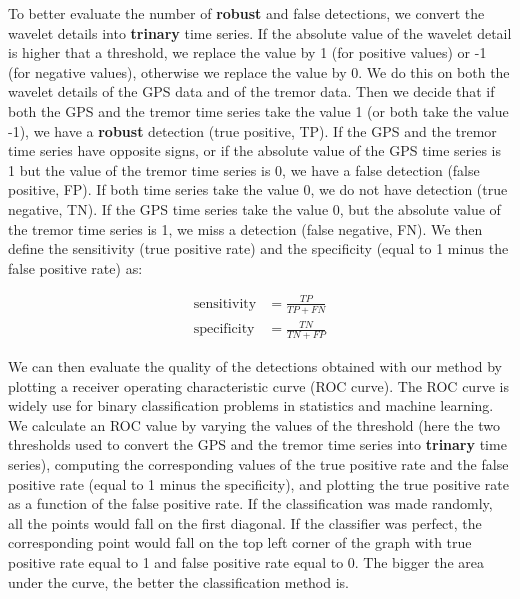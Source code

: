 \documentclass{article}
\begin{document}
To better evaluate the number of \textbf{robust} and false detections, we convert the wavelet details into \textbf{trinary} time series. If the absolute value of the wavelet detail is higher that a threshold, we replace the value by 1 (for positive values) or -1 (for negative values), otherwise we replace the value by 0. We do this on both the wavelet details of the GPS data and of the tremor data. Then we decide that if both the GPS and the tremor time series take the value 1 (or both take the value -1), we have a \textbf{robust} detection (true positive, TP). If the GPS and the tremor time series have opposite signs, or if the absolute value of the GPS time series is 1 but the value of the tremor time series is 0, we have a false detection (false positive, FP). If both time series take the value 0, we do not have detection (true negative, TN). If the GPS time series take the value 0, but the absolute value of the tremor time series is 1, we miss a detection (false negative, FN). We then define the sensitivity (true positive rate) and the specificity (equal to 1 minus the false positive rate) as:

\begin{equation}
\begin{aligned}
\text{sensitivity} &= \frac{TP}{TP + FN} \\
\text{specificity} &= \frac{TN} {TN + FP}
\end{aligned}
\end{equation}

We can then evaluate the quality of the detections obtained with our method by plotting a receiver operating characteristic curve (ROC curve). The ROC curve is widely use for binary classification problems in statistics and machine learning. We calculate an ROC value by varying the values of the threshold (here the two thresholds used to convert the GPS and the tremor time series into \textbf{trinary} time series), computing the corresponding values of the true positive rate and the false positive rate (equal to 1 minus the specificity), and plotting the true positive rate as a function of the false positive rate. If the classification was made randomly, all the points would fall on the first diagonal. If the classifier was perfect, the corresponding point would fall on the top left corner of the graph with true positive rate equal to 1 and false positive rate equal to 0. The bigger the area under the curve, the better the classification method is. \\
\end{document}
